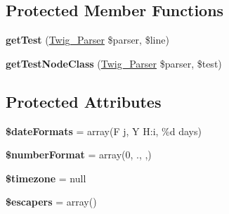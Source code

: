 \subsection*{Protected Member Functions}
\begin{DoxyCompactItemize}
\item 
{\bfseries get\+Test} (\hyperlink{classTwig__Parser}{Twig\+\_\+\+Parser} \$parser, \$line)\hypertarget{classTwig__Extension__Core_a23ee21584dfd125798b981aa57a75921}{}\label{classTwig__Extension__Core_a23ee21584dfd125798b981aa57a75921}

\item 
{\bfseries get\+Test\+Node\+Class} (\hyperlink{classTwig__Parser}{Twig\+\_\+\+Parser} \$parser, \$test)\hypertarget{classTwig__Extension__Core_a5fda439a206b3a2d789390bafb13ce9d}{}\label{classTwig__Extension__Core_a5fda439a206b3a2d789390bafb13ce9d}

\end{DoxyCompactItemize}
\subsection*{Protected Attributes}
\begin{DoxyCompactItemize}
\item 
{\bfseries \$date\+Formats} = array(\textquotesingle{}F j, Y H\+:i\textquotesingle{}, \textquotesingle{}\%d days\textquotesingle{})\hypertarget{classTwig__Extension__Core_a5a937c3a3a3a64b88b5abae9d767da35}{}\label{classTwig__Extension__Core_a5a937c3a3a3a64b88b5abae9d767da35}

\item 
{\bfseries \$number\+Format} = array(0, \textquotesingle{}.\textquotesingle{}, \textquotesingle{},\textquotesingle{})\hypertarget{classTwig__Extension__Core_a0f53abcaf3a5943d4a90805ffe590500}{}\label{classTwig__Extension__Core_a0f53abcaf3a5943d4a90805ffe590500}

\item 
{\bfseries \$timezone} = null\hypertarget{classTwig__Extension__Core_ae476fd90f2101ceb65103c52d4af6b8a}{}\label{classTwig__Extension__Core_ae476fd90f2101ceb65103c52d4af6b8a}

\item 
{\bfseries \$escapers} = array()\hypertarget{classTwig__Extension__Core_a888991a23305a6d57095d421a3d5d3e3}{}\label{classTwig__Extension__Core_a888991a23305a6d57095d421a3d5d3e3}

\end{DoxyCompactItemize}


